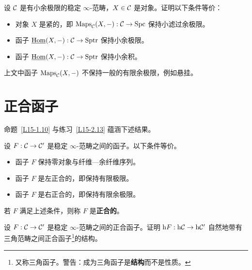 \begin{exercise}\label{L15-3.5}
设 $\mathcal{C}$ 是有小余极限的稳定 $\infty$-范畴，$X\in\mathcal{C}$ 是对象。证明以下条件等价：
\begin{itemize}[leftmargin=2.2em,itemsep=0.1em]
\item 对象 $X$ 是紧的，即 $\operatorname{Maps}_{\mathcal{C}}(X,-):\mathcal{C}\to\operatorname{Spc}$ 保持小滤过余极限。
\item 函子 $\underline{\operatorname{Hom}}(X,-):\mathcal{C}\to\mathrm{Sptr}$ 保持小余极限。
\item 函子 $\underline{\operatorname{Hom}}(X,-):\mathcal{C}\to\mathrm{Sptr}$ 保持小余积。
\end{itemize}
\end{exercise}

\begin{warning}\label{L15-3.6}
上文中函子 $\operatorname{Maps}_{\mathcal{C}}(X,-)$ 不保持一般的有限余极限，例如悬挂。
\end{warning}

\section{正合函子}

\nitem\label{L15-4.1} 命题~\ref{L15-1.10} 与练习~\ref{L15-2.13} 蕴涵下述结果。

\begin{theoremdef}\label{L15-4.2}
设 $F:\mathcal{C}\to\mathcal{C}'$ 是稳定 $\infty$-范畴之间的函子。以下条件等价。
\begin{itemize}[leftmargin=2.2em,itemsep=0.1em]
\item 函子 $F$ 保持零对象与纤维—余纤维序列。
\item 函子 $F$ 是左正合的，即保持有限极限。
\item 函子 $F$ 是右正合的，即保持有限余极限。
\end{itemize}
若 $F$ 满足上述条件，则称 $F$ 是\textbf{正合的}。
\end{theoremdef}


\begin{exercise}\label{L15-4.3}
设 $F:\mathcal{C}\to\mathcal{C}'$ 是稳定 $\infty$-范畴之间的正合函子。证明 $\mathrm{h}F:\mathrm{h}\mathcal{C}\to\mathrm{h}\mathcal{C}'$ 自然地带有三角范畴之间正合函子\footnote{又称三角函子。警告：成为三角函子是\textbf{结构}而不是性质。}的结构。
\end{exercise}

